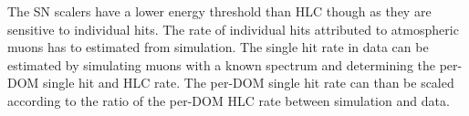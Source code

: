 The SN scalers have a lower energy threshold than HLC though as they are sensitive to individual hits. The rate of individual hits attributed to atmospheric muons has to estimated from simulation. The single hit rate in data can be estimated by simulating muons with a known spectrum and determining the per-DOM single hit and HLC rate. The per-DOM single hit rate can than be scaled according to the ratio of the per-DOM HLC rate between simulation and data. 








